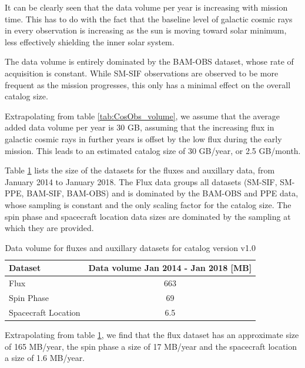 \documentclass[a4paper, 11pt]{article}
\newcommand{\dmVersion}{v1.0}
\begin{document}
It can be clearly seen that the data volume per year is increasing with mission time. This has to do with the fact that the baseline level of galactic cosmic rays in every observation is increasing as the sun is moving toward solar minimum, less effectively shielding the inner solar system.

The data volume is entirely dominated by the BAM-OBS dataset, whose rate of acquisition is constant. While SM-SIF observations are observed to be more frequent as the mission progresses, this only has a minimal effect on the overall catalog size.

Extrapolating from table \ref{tab:CosObs_volume}, we assume that the average added data volume per year is 30 GB, assuming that the increasing flux in galactic cosmic rays in further years is offset by the low flux during the early mission. This leads to an estimated catalog size of 30 GB/year, or 2.5 GB/month.


Table \ref{tab:AuxDat_volume} lists the size of the datasets for the fluxes and auxillary data, from January 2014 to January 2018. The Flux data groups all datasets (SM-SIF, SM-PPE, BAM-SIF, BAM-OBS) and is dominated by the BAM-OBS and PPE data, whose sampling is constant and the only scaling factor for the catalog size. The spin phase and spacecraft location data sizes are dominated by the sampling at which they are provided.

\begin{table}[!h]
\centering
{\begin{tabular}{|l|c|}
\hline
{Dataset} & {Data volume Jan 2014 - Jan 2018 [MB]} \\ \hline
Flux & 663 \\ \hline
Spin Phase & 69 \\ \hline
Spacecraft Location & 6.5 \\ \hline
\end{tabular}}
\caption{Data volume for fluxes and auxillary datasets for catalog version \dmVersion}
\label{tab:AuxDat_volume}
\end{table}

Extrapolating from table \ref{tab:AuxDat_volume}, we find that the flux dataset has an approximate size of 165 MB/year, the spin phase a size of 17 MB/year and the spacecraft location a size of 1.6 MB/year.
\end{document}

